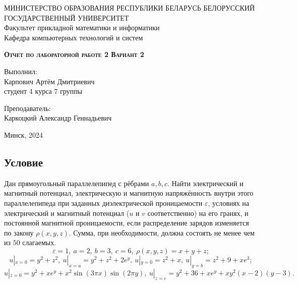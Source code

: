 \documentclass[11pt]{article}
\begin{document}
    \begin{titlepage}
    \newpage
    
    \begin{center}
    МИНИСТЕРСТВО ОБРАЗОВАНИЯ РЕСПУБЛИКИ БЕЛАРУСЬ БЕЛОРУССКИЙ ГОСУДАРСТВЕННЫЙ УНИВЕРСИТЕТ \\
    Факультет прикладной математики и информатики \\ Кафедра компьютерных технологий и систем
    \end{center}
    
    \vspace{8em}
    
    \vspace{2em}
    
    \begin{center}
    \textsc{\textbf{Отчет по лабораторной работе 2
    \linebreak Вариант 2}}
    \end{center}
    
    \vspace{6em}
    
    \begin{flushright}
        Выполнил:\\
        Карпович Артём Дмитриевич\\
        студент 4 курса 7 группы
    \end{flushright}

    \begin{flushright}
        Преподаватель:\\
        Каркоцкий Александр Геннадьевич
    \end{flushright}
    \vspace{\fill}
    
    \begin{center}
    Минск, 2024
    \end{center}
    
    \end{titlepage}

\begin{center}
    \section*{Условие}
\end{center}
Дан прямоугольный параллелепипед с рёбрами $a, b, c$. Найти электрический и магнитный потенциал, электрическую и магнитную напряжённость внутри этого параллелепипеда при заданных диэлектрической проницаемости $\varepsilon$, условиях на электрический
и магнитный потенциал ($u$ и $v$ соответственно) на его гранях, и постоянной магнитной
проницаемости, если распределение зарядов изменяется по закону $\rho(x, y, z)$. Сумма, при необходимости, должна состоять не менее чем из $50$ слагаемых.
$$\varepsilon=1,\ a=2,\ b=3,\ c=6,\ \rho(x,y,z)=x+y+z;$$
$$u|_{x=0}=y^2+z^2,\ u|_{x=a}=y^2+z^2+2e^y,\ u|_{y=0}=z^2+x,\ u|_{y=b}=z^2+9+xe^3;$$
$$u|_{z=0}=y^2+xe^y+x^2\sin{(3\pi x)}\sin{(2\pi y)},\ u|_{z=c}=y^2+36+xe^y+xy^2(x-2)(y-3).$$
\end{document}
